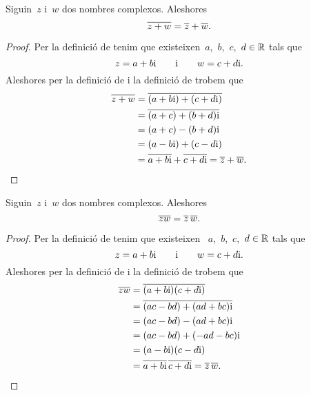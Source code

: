 \documentclass[../../main.tex]{subfiles}
\begin{document}
    \begin{proposition}
        \label{prop:el conjugat de la suma és la suma de conjugats}
        Siguin~\(z\) i~\(w\) dos nombres complexos.
        Aleshores
        \[
            \overline{z+w} = \overline{z}+\overline{w}.
        \]
        \begin{proof}
            Per la definició de  tenim que
            existeixen~\(a\),~\(b\),~\(c\),~\(d\in\mathbb{R}\) tals que
            \[
                z = a+b\mathrm{i}\qquad\text{i}\qquad w = c+d\mathrm{i}.
            \]
            Aleshores per la definició de 
            i la definició de  trobem
            que
            \begin{align*}
                \overline{z+w} &= \overline{(a+b\mathrm{i})+(c+d\mathrm{i})} \\
                               &= \overline{(a+c)+(b+d)\mathrm{i}} \\
                               &= (a+c)-(b+d)\mathrm{i} \\
                               &= (a-b\mathrm{i})+(c-d\mathrm{i}) \\
                               &= \overline{a+b\mathrm{i}}+\overline{c+d\mathrm{i}}
                                = \overline{z}+\overline{w}.\qedhere
            \end{align*}
        \end{proof}
    \end{proposition}
    \begin{proposition}
        \label{prop:el conjugat del producte és el producte de conjugats}
        Siguin~\(z\) i~\(w\) dos nombres complexos.
        Aleshores
        \[
            \overline{zw} = \overline{z}\,\overline{w}.
        \]
        \begin{proof}
            Per la definició de  tenim que existeixen
           ~\(a\),~\(b\),~\(c\),~\(d\in\mathbb{R}\) tals que
            \[
                z = a+b\mathrm{i}\qquad\text{i}\qquad w = c+d\mathrm{i}.
            \]
            Aleshores per la definició
            de  i la definició
            de  trobem que
            \begin{align*}
                \overline{zw} &= \overline{(a+b\mathrm{i})(c+d\mathrm{i})} \\
                              &= \overline{(ac-bd)+(ad+bc)\mathrm{i}} \\
                              &= (ac-bd)-(ad+bc)\mathrm{i} \\
                              &= (ac-bd)+(-ad-bc)\mathrm{i} \\
                              &= (a-b\mathrm{i})(c-d\mathrm{i}) \\
                              &= \overline{a+b\mathrm{i}}\,\overline{c+d\mathrm{i}}
                               = \overline{z}\,\overline{w}\qedhere.
            \end{align*}
        \end{proof}
    \end{proposition}
\end{document}

